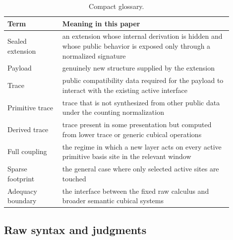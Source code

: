 \documentclass{lmcs}
\begin{document}
\begin{table}[t]
\centering
\caption{Compact glossary.}
\label{tab:glossary}
\small
\begin{tabular}{@{}p{0.22\linewidth}p{0.68\linewidth}@{}}
\toprule
Term & Meaning in this paper \\
\midrule
Sealed extension & an extension whose internal derivation is hidden and whose public behavior is exposed only through a normalized signature \\
Payload & genuinely new structure supplied by the extension \\
Trace & public compatibility data required for the payload to interact with the existing active interface \\
Primitive trace & trace that is not synthesized from other public data under the counting normalization \\
Derived trace & trace present in some presentation but computed from lower trace or generic cubical operations \\
Full coupling & the regime in which a new layer acts on every active primitive basis site in the relevant window \\
Sparse footprint & the general case where only selected active sites are touched \\
Adequacy boundary & the interface between the fixed raw calculus and broader semantic cubical systems \\
\bottomrule
\end{tabular}
\end{table}

\subsection{Raw syntax and judgments}
\label{subsec:raw-syntax}
\end{document}

